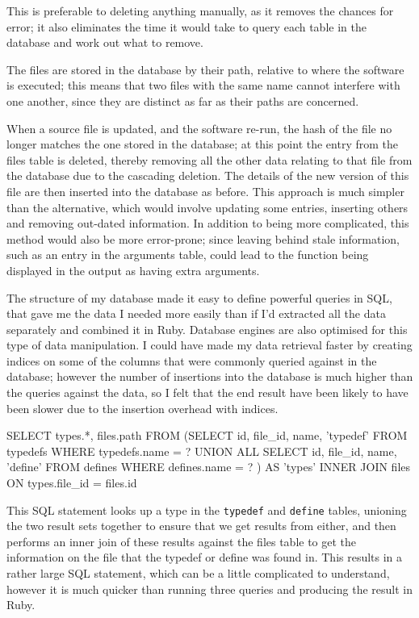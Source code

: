     This is preferable to deleting anything manually, as it removes the
    chances for error; it also eliminates the time it would take to query each
    table in the database and work out what to remove.

    The files are stored in the database by their path, relative to where the
    software is executed; this means that two files with the same name cannot
    interfere with one another, since they are distinct as far as their paths
    are concerned.

    When a source file is updated, and the software re-run, the hash of the file
    no longer matches the one stored in the database; at this point the entry
    from the files table is deleted, thereby removing all the other data
    relating to that file from the database due to the cascading deletion. The
    details of the new version of this file are then inserted into the database
    as before. This approach is much simpler than the alternative, which would
    involve updating some entries, inserting others and removing out-dated
    information. In addition to being more complicated, this method would also
    be more error-prone; since leaving behind stale information, such as an
    entry in the arguments table, could lead to the function being displayed
    in the output as having extra arguments.

    The structure of my database made it easy to define powerful queries in
    SQL, that gave me the data I needed more easily than if I'd extracted all
    the data separately and combined it in Ruby. Database engines are also
    optimised for this type of data manipulation. I could have made my data
    retrieval faster by creating indices on some of the columns that were
    commonly queried against in the database; however the number of insertions
    into the database is much higher than the queries against the data, so I
    felt that the end result have been likely to have been slower due to the
    insertion overhead with indices.

    \begin{code}[language=sql, gobble=6]
      SELECT types.*, files.path FROM
       (SELECT id, file_id, name, 'typedef' FROM typedefs WHERE typedefs.name = ?
        UNION ALL
        SELECT id, file_id, name, 'define' FROM defines WHERE defines.name = ?
       ) AS 'types' INNER JOIN files ON types.file_id = files.id
    \end{code}

    This SQL statement looks up a type in the \lstinline|typedef| and
    \lstinline|define| tables, unioning the two result sets together to ensure
    that we get results from either, and then performs an inner join of these
    results against the files table to get the information on the file that the
    typedef or define was found in. This results in a rather large SQL
    statement, which can be a little complicated to understand, however it is
    much quicker than running three queries and producing the result in Ruby.

